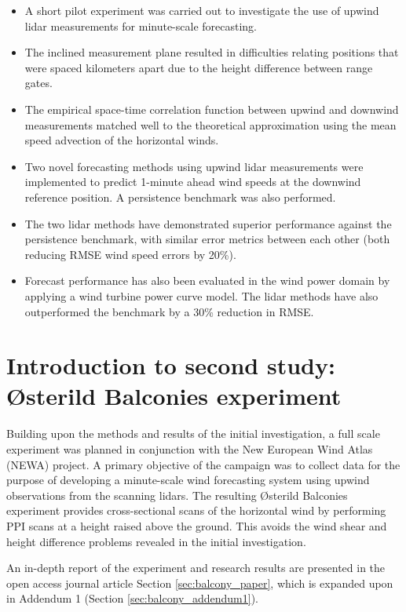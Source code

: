 \bigskip

\begin{itemize}
    \item A short pilot experiment was carried out to investigate the use of upwind lidar measurements for minute-scale forecasting.
    \item The inclined measurement plane resulted in difficulties relating positions that were spaced kilometers apart due to the height difference between range gates.
    \item The empirical space-time correlation function between upwind and downwind measurements matched well to the theoretical approximation using the mean speed advection of the horizontal winds.
    \item Two novel forecasting methods using upwind lidar measurements were implemented to predict 1-minute ahead wind speeds at the downwind reference position. A persistence benchmark was also performed.
    \item The two lidar methods have demonstrated superior performance against the persistence benchmark, with similar error metrics between each other (both reducing RMSE wind speed errors by 20\%).
    \item Forecast performance has also been evaluated in the wind power domain by applying a wind turbine power curve model. The lidar methods have also outperformed the benchmark by a 30\% reduction in RMSE.
\end{itemize}

\clearpage
\section{Introduction to second study: 
{\O}sterild Balconies experiment}
\label{sec:balcony_intro}

Building upon the methods and results of the initial investigation, a full scale experiment was planned in conjunction with the New European Wind Atlas (NEWA) project. A primary objective of the campaign was to collect data for the purpose of developing a minute-scale wind forecasting system using upwind observations from the scanning lidars. The resulting {\O}sterild Balconies experiment provides cross-sectional scans of the horizontal wind by performing PPI scans at a height raised above the ground. This avoids the wind shear and height difference problems revealed in the initial investigation.

\noindent
An in-depth report of the experiment and research results are presented in the open access journal article Section \ref{sec:balcony_paper}, which is expanded upon in Addendum 1 (Section \ref{sec:balcony_addendum1}).

